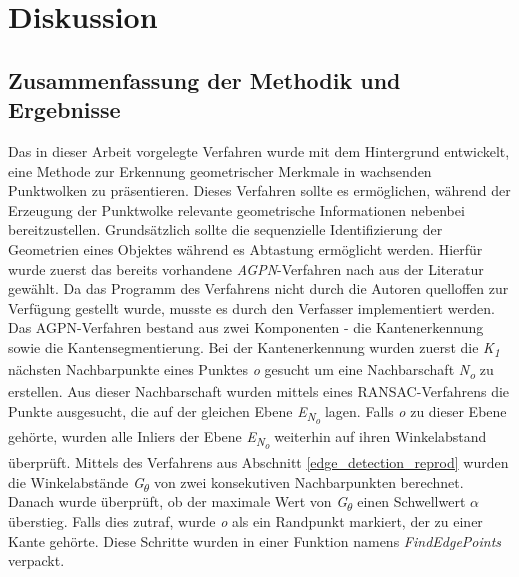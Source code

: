 
\chapter{Diskussion}
\section{Zusammenfassung der Methodik und Ergebnisse}
Das in dieser Arbeit vorgelegte Verfahren wurde mit dem Hintergrund entwickelt, eine Methode zur Erkennung geometrischer Merkmale in wachsenden Punktwolken zu präsentieren. Dieses Verfahren sollte es ermöglichen, während der Erzeugung der Punktwolke relevante geometrische Informationen nebenbei bereitzustellen. Grundsätzlich sollte die sequenzielle Identifizierung der Geometrien eines Objektes während es Abtastung ermöglicht werden. Hierfür wurde zuerst das bereits vorhandene \textit{AGPN}-Verfahren nach \autocite{ni_edge_2016} aus der Literatur gewählt. Da das Programm des Verfahrens nicht durch die Autoren quelloffen zur Verfügung gestellt wurde, musste es durch den Verfasser implementiert werden. Das AGPN-Verfahren bestand aus zwei Komponenten - die Kantenerkennung sowie die Kantensegmentierung. Bei der Kantenerkennung wurden zuerst die \textit{K\textsubscript{1}} nächsten Nachbarpunkte eines Punktes \textit{o} gesucht um eine Nachbarschaft \textit{N\textsubscript{o}} zu erstellen. Aus dieser Nachbarschaft wurden mittels eines RANSAC-Verfahrens die Punkte ausgesucht, die auf der gleichen Ebene \textit{E\textsubscript{N\textsubscript{o}}} lagen. Falls \textit{o} zu dieser Ebene gehörte, wurden alle Inliers der Ebene \textit{E\textsubscript{N\textsubscript{o}}} weiterhin auf ihren Winkelabstand überprüft. Mittels des Verfahrens aus Abschnitt \ref{edge_detection_reprod} wurden die Winkelabstände \textit{G\textsubscript{$\theta$}} von zwei konsekutiven Nachbarpunkten berechnet. Danach wurde überprüft, ob der maximale Wert von \textit{G\textsubscript{$\theta$}} einen Schwellwert \textit{$\alpha$} überstieg. Falls dies zutraf, wurde \textit{o} als ein Randpunkt markiert, der zu einer Kante gehörte. Diese Schritte wurden in einer Funktion namens \textit{FindEdgePoints} verpackt. 

